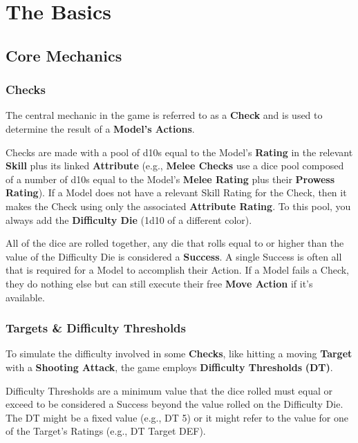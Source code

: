 \documentclass[
]{book}
\begin{document}
\hypertarget{basics}{%
\chapter{The Basics}\label{basics}}

\hypertarget{core-mechanics}{%
\section{Core Mechanics}\label{core-mechanics}}

\hypertarget{checks}{%
\subsection*{Checks}\label{checks}}

The central mechanic in the game is referred to as a \textbf{Check} and is used to determine the result of a \textbf{Model's Actions}.

Checks are made with a pool of d10s equal to the Model's \textbf{Rating} in the relevant \textbf{Skill} plus its linked \textbf{Attribute} (e.g., \textbf{Melee Checks} use a dice pool composed of a number of d10s equal to the Model's \textbf{Melee Rating} plus their \textbf{Prowess Rating}). If a Model does not have a relevant Skill Rating for the Check, then it makes the Check using only the associated \textbf{Attribute Rating}. To this pool, you always add the \textbf{Difficulty Die} (1d10 of a different color).

All of the dice are rolled together, any die that rolls equal to or higher than the value of the Difficulty Die is considered a \textbf{Success}. A single Success is often all that is required for a Model to accomplish their Action. If a Model fails a Check, they do nothing else but can still execute their free \textbf{Move Action} if it's available.

\hypertarget{dt}{%
\subsection*{Targets \& Difficulty Thresholds}\label{dt}}

To simulate the difficulty involved in some \textbf{Checks}, like hitting a moving \textbf{Target} with a \textbf{Shooting Attack}, the game employs \textbf{Difficulty Thresholds} \textbf{(DT)}.

Difficulty Thresholds are a minimum value that the dice rolled must equal or exceed to be considered a Success beyond the value rolled on the Difficulty Die. The DT might be a fixed value (e.g., DT 5) or it might refer to the value for one of the Target's Ratings (e.g., DT Target DEF).  
\end{document}
